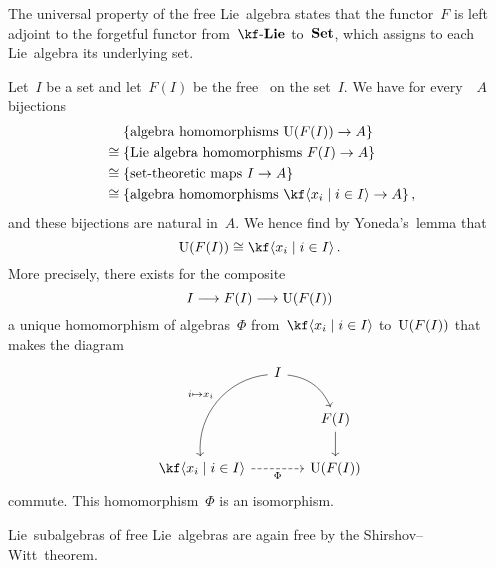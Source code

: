 \begin{remark}
\begin{enumerate}
      The universal property of the free Lie~algebra states that the functor~$F$ is left adjoint to the forgetful functor from~$\cLie{\kf}$ to~$\mathbf{Set}$, which assigns to each Lie~algebra its underlying set.
  \end{enumerate}
\end{remark}


\begin{example}
  \label{uea of free lie algebra}
  Let~$I$ be a set and let~$F(I)$ be the free~{\liealgebra{$\kf$}} on the set~$I$.
  We have for every~\algebra{$\kf$}~$A$ bijections
  \begin{align*}
    {}&
    \{ \textstyle\text{algebra homomorphisms~$\Univ(F(I)) \to A$} \}
    \\
    \cong{}&
    \{ \textstyle\text{Lie~algebra homomorphisms~$F(I) \to A$} \}
    \\
    \cong{}&
    \{ \textstyle\text{set-theoretic maps~$I \to A$} \}
    \\\
    \cong{}&
    \{ \textstyle\text{algebra homomorphisms~$\kf\gen{x_i \suchthat i \in I} \to A$} \} \,,
  \end{align*}
  and these bijections are natural in~$A$.
  We hence find by Yoneda’s~lemma that
  \[
    \Univ(F(I))
    \cong
    \kf\gen{x_i \suchthat i \in I} \,.
  \]
  More precisely, there exists for the composite
  \[
    I
    \to
    F(I)
    \to
    \Univ(F(I))
  \]
  a unique homomorphism of algebras~$\Phi$ from~$\kf\gen{x_i \suchthat i \in I}$ to~$\operatorname{U}(F(I))$ that makes the diagram
  \[
    \begin{tikzcd}[column sep = small]
        {}
      & I
        \arrow[bend right, out = -45, in=225]{ddl}[above left]{i \mapsto x_i}
        \arrow[bend left]{dr}
      & {}
      \\
        {}
      & {}
      & F(I)
        \arrow{d}
      \\
        \kf\gen{x_i \suchthat i \in I}
        \arrow[dashed]{rr}[below]{\Phi}
      & {}
      & \Univ(F(I))
    \end{tikzcd}
  \]
  commute.
  This homomorphism~$\Phi$ is an isomorphism.
\end{example}


\begin{remark}
  Lie~subalgebras of free Lie~algebras are again free by the Shirshov--Witt~theorem.
\end{remark}





